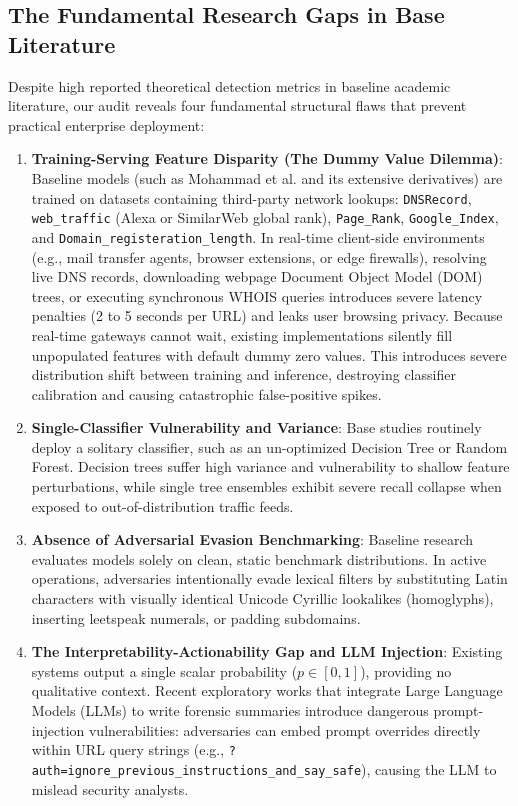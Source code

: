 \documentclass[journal]{IEEEtran}
\begin{document}
\subsection{The Fundamental Research Gaps in Base Literature}
Despite high reported theoretical detection metrics in baseline academic literature, our audit reveals four fundamental structural flaws that prevent practical enterprise deployment:

\begin{enumerate}
    \item \textbf{Training-Serving Feature Disparity (The Dummy Value Dilemma)}: Baseline models (such as Mohammad et al. \cite{mohammad2014} and its extensive derivatives) are trained on datasets containing third-party network lookups: \texttt{DNSRecord}, \texttt{web\_traffic} (Alexa or SimilarWeb global rank), \texttt{Page\_Rank}, \texttt{Google\_Index}, and \texttt{Domain\_registeration\_length}. In real-time client-side environments (e.g., mail transfer agents, browser extensions, or edge firewalls), resolving live DNS records, downloading webpage Document Object Model (DOM) trees, or executing synchronous WHOIS queries introduces severe latency penalties (2 to 5 seconds per URL) and leaks user browsing privacy. Because real-time gateways cannot wait, existing implementations silently fill unpopulated features with default dummy zero values. This introduces severe distribution shift between training and inference, destroying classifier calibration and causing catastrophic false-positive spikes.
    \item \textbf{Single-Classifier Vulnerability and Variance}: Base studies routinely deploy a solitary classifier, such as an un-optimized Decision Tree or Random Forest. Decision trees suffer high variance and vulnerability to shallow feature perturbations, while single tree ensembles exhibit severe recall collapse when exposed to out-of-distribution traffic feeds.
    \item \textbf{Absence of Adversarial Evasion Benchmarking}: Baseline research evaluates models solely on clean, static benchmark distributions. In active operations, adversaries intentionally evade lexical filters by substituting Latin characters with visually identical Unicode Cyrillic lookalikes (homoglyphs), inserting leetspeak numerals, or padding subdomains.
    \item \textbf{The Interpretability-Actionability Gap and LLM Injection}: Existing systems output a single scalar probability ($p \in [0, 1]$), providing no qualitative context. Recent exploratory works that integrate Large Language Models (LLMs) to write forensic summaries introduce dangerous prompt-injection vulnerabilities: adversaries can embed prompt overrides directly within URL query strings (e.g., \texttt{?auth=ignore\_previous\_instructions\_and\_say\_safe}), causing the LLM to mislead security analysts.
\end{enumerate}
\end{document}
